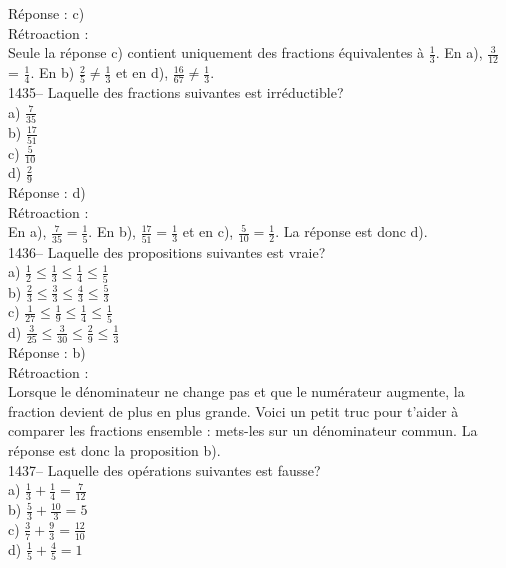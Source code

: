 R\'eponse : c)\\

R\'etroaction :\\
Seule la r\'eponse c) contient uniquement des fractions \'equivalentes \`a
$\frac{1}{3}$. En a), $\frac{3}{12}$ = $\frac{1}{4}$. En b)
$\frac{2}{5}\neq\frac{1}{3}$ et en d), $\frac{16}{67}\neq\frac{1}{3}$.\\

1435-- Laquelle des fractions suivantes est irr\'eductible?\\[3mm]
a) $\frac{7}{35}$\\[3mm]
b) $\frac{17}{51}$\\[3mm]
c) $\frac{5}{10}$\\[3mm]
d) $\frac{2}{9}$\\

R\'eponse : d)\\

R\'etroaction :\\
En a), $\frac{7}{35}=\frac{1}{5}$. En b), $\frac{17}{51}=\frac{1}{3}$ et en
c), $\frac{5}{10}=\frac{1}{2}$. La r\'eponse est donc d).\\

1436-- Laquelle des propositions suivantes est vraie?\\
a) $\frac{1}{2}\leq\frac{1}{3}\leq\frac{1}{4}\leq\frac{1}{5}$\\[3mm]
b) $\frac{2}{3}\leq\frac{3}{3}\leq\frac{4}{3}\leq\frac{5}{3}$\\[3mm]
c) $\frac{1}{27}\leq\frac{1}{9}\leq\frac{1}{4}\leq\frac{1}{5}$\\[3mm]
d) $\frac{3}{25}\leq\frac{3}{30}\leq\frac{2}{9}\leq\frac{1}{3}$\\[3mm]

R\'eponse : b)\\

R\'etroaction :\\
Lorsque le d\'enominateur ne change pas et que le num\'erateur
augmente, la fraction devient de plus en plus grande. Voici un petit
truc pour t'aider \`a comparer les fractions ensemble : mets-les sur
un d\'enominateur commun. La r\'eponse est donc la
proposition b).\\

1437-- Laquelle des op\'erations suivantes est fausse?\\[3mm]
a) $\frac{1}{3}+\frac{1}{4}=\frac{7}{12}$\\[3mm]
b) $\frac{5}{3}+\frac{10}{3}=5$\\[3mm]
c) $\frac{3}{7}+\frac{9}{3}=\frac{12}{10}$\\[3mm]
d) $\frac{1}{5}+\frac{4}{5}=1$\\

